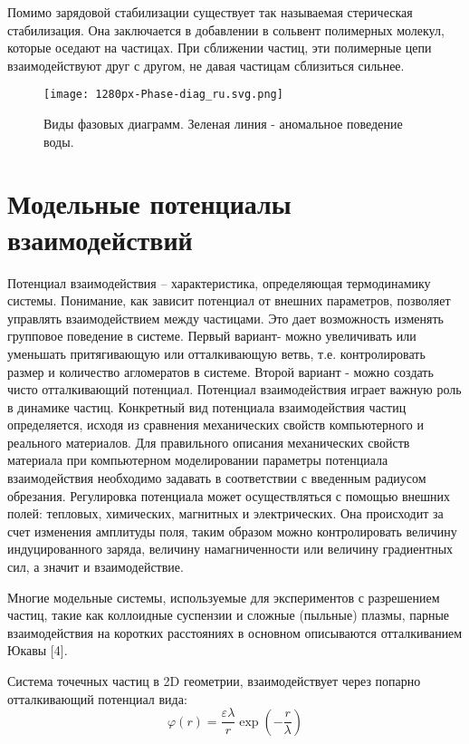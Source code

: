 Помимо зарядовой стабилизации существует так называемая стерическая стабилизация. Она заключается в добавлении в сольвент полимерных молекул, которые оседают на частицах. При сближении частиц, эти полимерные цепи взаимодействуют друг с другом, не давая частицам сблизиться сильнее. 

\begin{figure}[!h]
\begin{center}
\texttt{[image: 1280px-Phase-diag\_ru.svg.png]}
\caption{Виды фазовых диаграмм. Зеленая линия - аномальное поведение воды.}
\label{част}
\end{center}
\end{figure}

\section{Модельные потенциалы взаимодействий}
Потенциал взаимодействия – характеристика, определяющая термодинамику системы. Понимание, как зависит потенциал от внешних параметров, позволяет управлять взаимодействием между частицами. Это дает возможность изменять групповое поведение в системе. Первый вариант- можно увеличивать или уменьшать притягивающую или отталкивающую ветвь, т.е. контролировать размер и количество агломератов в системе. Второй вариант - можно создать чисто отталкивающий потенциал. Потенциал взаимодействия играет важную роль в динамике частиц. Конкретный вид потенциала взаимодействия частиц определяется, исходя из сравнения механических свойств компьютерного и реального материалов. Для правильного описания механических свойств материала при компьютерном моделировании параметры потенциала взаимодействия необходимо задавать в соответствии с введенным радиусом обрезания. Регулировка потенциала может осуществляться с помощью внешних полей: тепловых, химических, магнитных и электрических. Она происходит за счет изменения амплитуды поля, таким образом можно контролировать величину индуцированного заряда, величину намагниченности или величину градиентных сил, а значит и взаимодействие. 
 
Многие модельные системы, используемые для экспериментов с разрешением частиц, такие как коллоидные суспензии и сложные (пыльные) плазмы, парные взаимодействия на коротких расстояниях в основном описываются отталкиванием Юкавы [4].

Система точечных частиц в 2D геометрии, взаимодействует через попарно отталкивающий потенциал вида:
\begin{equation}
\varphi(r)=\frac{\varepsilon \lambda}{r} \exp \left(-\frac{r}{\lambda}\right)
\end{equation}

